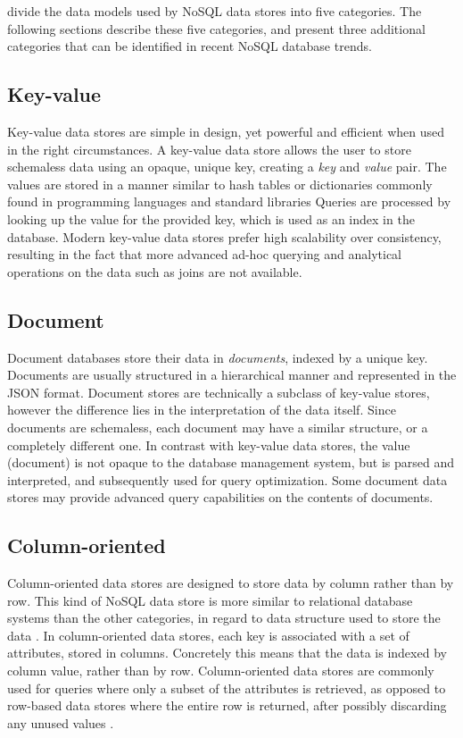 \textcite{Nayak2013} divide the data models used by NoSQL data stores into five categories.
The following sections describe these five categories, and present three additional categories that can be identified in recent NoSQL database trends.

\subsection{Key-value}
\label{subsec:key-value}

Key-value data stores are simple in design, yet powerful and efficient when used in the right circumstances.
A key-value data store allows the user to store schemaless data using an opaque, unique key, creating a \textit{key} and \textit{value} pair.
The values are stored in a manner similar to hash tables or dictionaries commonly found in programming languages and standard libraries
Queries are processed by looking up the value for the provided key, which is used as an index in the database.
Modern key-value data stores prefer high scalability over consistency, resulting in the fact that more advanced ad-hoc querying and analytical operations on the data such as joins are not available.

\subsection{Document}
\label{subsec:document}

Document databases store their data in \textit{documents}, indexed by a unique key.
Documents are usually structured in a hierarchical manner and represented in the JSON format.
Document stores are technically a subclass of key-value stores, however the difference lies in the interpretation of the data itself.
Since documents are schemaless, each document may have a similar structure, or a completely different one.
In contrast with key-value data stores, the value (document) is not opaque to the database management system, but is parsed and interpreted, and subsequently used for query optimization.
Some document data stores may provide advanced query capabilities on the contents of documents.

\subsection{Column-oriented}
\label{subsec:column-oriented}

Column-oriented data stores are designed to store data by column rather than by row.
This kind of NoSQL data store is more similar to relational database systems than the other categories, in regard to data structure used to store the data \autocite{Abadi2008}.
In column-oriented data stores, each key is associated with a set of attributes, stored in columns.
Concretely this means that the data is indexed by column value, rather than by row.
Column-oriented data stores are commonly used for queries where only a subset of the attributes is retrieved, as opposed to row-based data stores where the entire row is returned, after possibly discarding any unused values \autocite{Abadi2009}.

